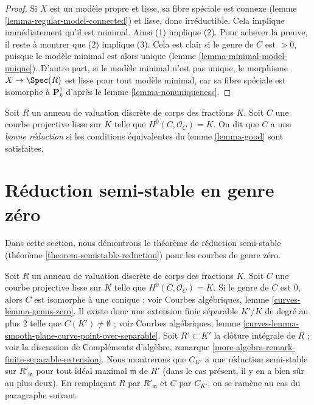 \begin{proof}
Si $X$ est un modèle propre et lisse, sa fibre spéciale est connexe
(lemme \ref{lemma-regular-model-connected}) et lisse, donc irréductible.
Cela implique immédiatement qu'il est minimal. Ainsi (1) implique (2).
Pour achever la preuve, il reste à montrer que (2) implique (3). Cela est
clair si le genre de $C$ est $>0$, puisque le modèle minimal est alors
unique (lemme \ref{lemma-minimal-model-unique}). D'autre part, si le modèle
minimal n'est pas unique, le morphisme $X\to\Spec(R)$ est lisse pour tout
modèle minimal, car sa fibre spéciale est isomorphe à $\mathbf{P}^1_k$
d'après le lemme \ref{lemma-nonuniqueness}.
\end{proof}

\begin{definition}
\label{definition-good}
Soit $R$ un anneau de valuation discrète de corps des fractions $K$.
Soit $C$ une courbe projective lisse sur $K$ telle que
$H^0(C,\mathcal{O}_C)=K$. On dit que $C$ a une {\it bonne réduction} si
les conditions équivalentes du lemme \ref{lemma-good} sont satisfaites.
\end{definition}








\section{Réduction semi-stable en genre zéro}
\label{section-semistable-reduction-genus-zero}

\noindent
Dans cette section, nous démontrons le théorème de réduction semi-stable
(théorème \ref{theorem-semistable-reduction}) pour les courbes de genre
zéro.

\medskip\noindent
Soit $R$ un anneau de valuation discrète de corps des fractions $K$.
Soit $C$ une courbe projective lisse sur $K$ telle que
$H^0(C,\mathcal{O}_C)=K$. Si le genre de $C$ est $0$, alors $C$ est
isomorphe à une conique ; voir Courbes algébriques, lemme
\ref{curves-lemma-genus-zero}. Il existe donc une extension finie séparable
$K'/K$ de degré au plus $2$ telle que $C(K') \not = \emptyset$ ; voir Courbes
algébriques, lemme
\ref{curves-lemma-smooth-plane-curve-point-over-separable}. Soit
$R'\subset K'$ la clôture intégrale de $R$ ; voir la discussion de
Compléments d'algèbre, remarque
\ref{more-algebra-remark-finite-separable-extension}. Nous montrerons que
$C_{K'}$ a une réduction semi-stable sur $R'_{\mathfrak m}$ pour tout idéal
maximal $\mathfrak m$ de $R'$ (dans le cas présent, il y en a bien sûr au
plus deux). En remplaçant $R$ par $R'_{\mathfrak m}$ et $C$ par $C_{K'}$,
on se ramène au cas du paragraphe suivant.

